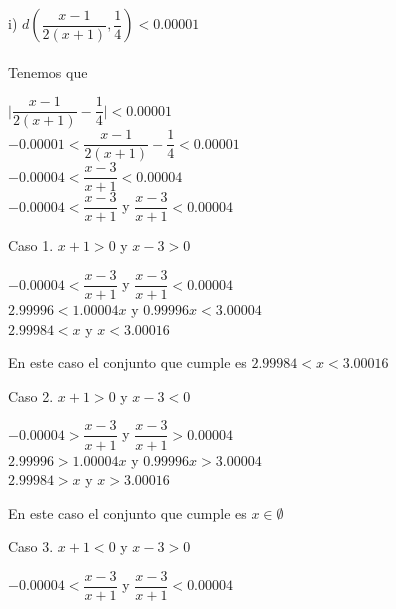 \documentclass[12pt,a4paper,scrartcl]{article}
\begin{document}
{\pagebreak
i) $d(\dfrac{x-1}{2(x+1)},\dfrac{1}{4}) < 0.00001$\\
\\Tenemos que\\
\begin{center}
$\lvert \dfrac{x-1}{2(x+1)}-\dfrac{1}{4}\lvert < 0.00001$\\\vspace{1em}
$-0.00001<\dfrac{x-1}{2(x+1)}-\dfrac{1}{4}< 0.00001$\\\vspace{1em}
$-0.00004<\dfrac{x-3}{x+1}< 0.00004$\\\vspace{1em}
$-0.00004<\dfrac{x-3}{x+1}$ y $\dfrac{x-3}{x+1}< 0.00004$\\
\end{center}
Caso 1. $x+1>0$ y $x-3>0$\\
\begin{center}
$-0.00004<\dfrac{x-3}{x+1}$ y $\dfrac{x-3}{x+1}< 0.00004$\\\vspace{1em}
$2.99996<1.00004x$ y $0.99996x<3.00004$\\\vspace{1em}
$2.99984<x$ y $x<3.00016$\\
\end{center}
\begin{flushleft}
En este caso el conjunto que cumple es $2.99984<x<3.00016$\\
\end{flushleft}
Caso 2. $x+1>0$ y $x-3<0$\\
\begin{center}
$-0.00004>\dfrac{x-3}{x+1}$ y $\dfrac{x-3}{x+1}> 0.00004$\\\vspace{1em}
$2.99996>1.00004x$ y $0.99996x>3.00004$\\\vspace{1em}
$2.99984>x$ y $x>3.00016$\\\vspace{1em}
\begin{flushleft}
En este caso el conjunto que cumple es $x\in\emptyset$\\
\end{flushleft}
\end{center}
Caso 3. $x+1<0$ y $x-3>0$\\
\begin{center}
$-0.00004<\dfrac{x-3}{x+1}$ y $\dfrac{x-3}{x+1}< 0.00004$\\\vspace{1em}

\end{center}}
\end{document}

